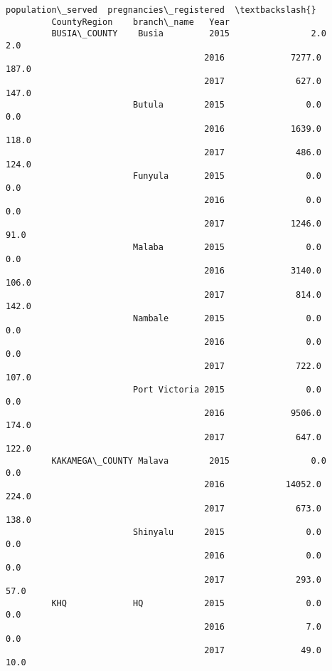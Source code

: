 \documentclass[11pt]{article}
\begin{document}
\begin{Verbatim}[commandchars=\\\{\}]
                                             population\_served  pregnancies\_registered  \textbackslash{}
         CountyRegion    branch\_name   Year                                              
         BUSIA\_COUNTY    Busia         2015                2.0                     2.0   
                                       2016             7277.0                   187.0   
                                       2017              627.0                   147.0   
                         Butula        2015                0.0                     0.0   
                                       2016             1639.0                   118.0   
                                       2017              486.0                   124.0   
                         Funyula       2015                0.0                     0.0   
                                       2016                0.0                     0.0   
                                       2017             1246.0                    91.0   
                         Malaba        2015                0.0                     0.0   
                                       2016             3140.0                   106.0   
                                       2017              814.0                   142.0   
                         Nambale       2015                0.0                     0.0   
                                       2016                0.0                     0.0   
                                       2017              722.0                   107.0   
                         Port Victoria 2015                0.0                     0.0   
                                       2016             9506.0                   174.0   
                                       2017              647.0                   122.0   
         KAKAMEGA\_COUNTY Malava        2015                0.0                     0.0   
                                       2016            14052.0                   224.0   
                                       2017              673.0                   138.0   
                         Shinyalu      2015                0.0                     0.0   
                                       2016                0.0                     0.0   
                                       2017              293.0                    57.0   
         KHQ             HQ            2015                0.0                     0.0   
                                       2016                7.0                     0.0   
                                       2017               49.0                    10.0   

\end{Verbatim}
\end{document}

